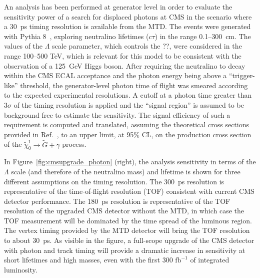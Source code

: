 An analysis has been performed at generator level in order to evaluate the sensitivity power of a search for displaced photons at CMS in the scenario where a 30~ps timing resolution is available from the MTD. The events were generated with Pythia 8~\cite{Sjostrand:2007gs}, exploring neutralino lifetimes ($c\tau$) in the range 0.1--300~cm. The values of the $\Lambda$ scale parameter, which controls the ??,%
were considered in the range 100--500 TeV, which is relevant for this model to be consistent with the observation of a 125~GeV Higgs boson. After requiring the neutralino to decay within the CMS ECAL acceptance and the photon energy being above a ``trigger-like'' threshold, the generator-level photon time of flight was smeared according to the expected experimental resolutions. A cutoff at a photon time greater than 3$\sigma$ of the timing resolution is applied and the ``signal region'' is assumed to be background free to estimate the sensitivity. The signal efficiency of such a requirement is computed and translated, assuming the theoretical cross sections provided in Ref.~\cite{Strassler:2006im}, to an upper limit, at 95\% CL, on the production cross section of the $\tilde{\chi}_0^1 \to \tilde{G} + \gamma$ process.

In Figure~\ref{fig:cmsupgrade_photon} (right), the analysis sensitivity in terms of the $\Lambda$ scale (and therefore of the neutralino mass) and lifetime is shown for three different assumptions on the timing resolution. The 300~ps resolution is representative of the time-of-flight resolution (TOF) consistent with current CMS detector performance. The 180~ps resolution is representative of the TOF resolution of the upgraded CMS detector without the MTD, in which case the TOF measurement will be dominated by the time spread of the luminous region. The vertex timing provided by the MTD detector will bring the TOF resolution to about 30~ps. As visible in the figure, a full-scope upgrade of the CMS detector with photon and track timing will provide a dramatic increase in sensitivity at short lifetimes and high masses, even with the first $300\,\,\mathrm{fb}^{-1}$ of integrated luminosity.

